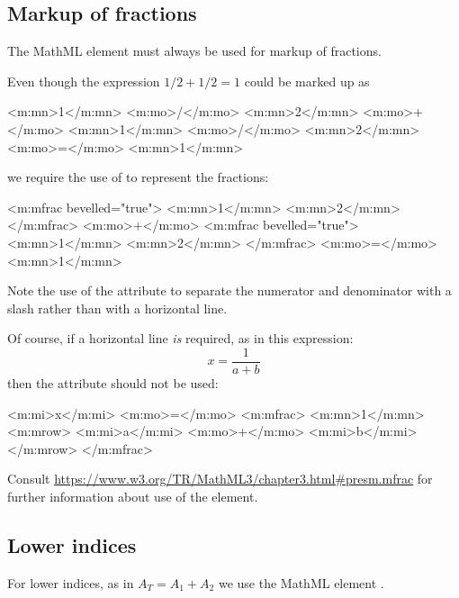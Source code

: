 \documentclass[english,a4paper,11pt]{article}
\begin{document}
\subsection{Markup of fractions}
The MathML element  must always be used for markup of fractions.

Even though the expression $1/2 + 1/2 =1$ could be marked up as
\begin{kodeblokk}
\begin{verbatimtab}[3]
<m:mn>1</m:mn>
<m:mo>/</m:mo>
<m:mn>2</m:mn>
<m:mo>+</m:mo>
<m:mn>1</m:mn>
<m:mo>/</m:mo>
<m:mn>2</m:mn>
<m:mo>=</m:mo>
<m:mn>1</m:mn>
\end{verbatimtab}
\end{kodeblokk}
we require the use of  to represent the fractions:
\begin{kodeblokk}
\begin{verbatimtab}[3]
<m:mfrac bevelled="true">
	<m:mn>1</m:mn>
	<m:mn>2</m:mn>
</m:mfrac>
<m:mo>+</m:mo>
<m:mfrac bevelled="true">
	<m:mn>1</m:mn>
	<m:mn>2</m:mn>
</m:mfrac>
<m:mo>=</m:mo>
<m:mn>1</m:mn>
\end{verbatimtab}
\end{kodeblokk}
Note the use of the  attribute to separate the numerator and denominator  with a slash rather than with a horizontal line.

Of course, if a horizontal line \emph{is} required, as in this expression:
\begin{equation}
x = \frac{1}{a + b}
\end{equation}
then the  attribute should not be used:
\begin{kodeblokk}
\begin{verbatimtab}[3]
<m:mi>x</m:mi>
<m:mo>=</m:mo>
<m:mfrac>
	<m:mn>1</m:mn>
	<m:mrow>
		<m:mi>a</m:mi>
		<m:mo>+</m:mo>
		<m:mi>b</m:mi>
	</m:mrow>
</m:mfrac>
\end{verbatimtab}
\end{kodeblokk}


\bigskip
Consult \url{https://www.w3.org/TR/MathML3/chapter3.html#presm.mfrac} for further information about use of the  element. 

\subsection{Lower indices}

For lower indices, as in $A_T = A_1 + A_2$ we use the MathML element .
\end{document}
